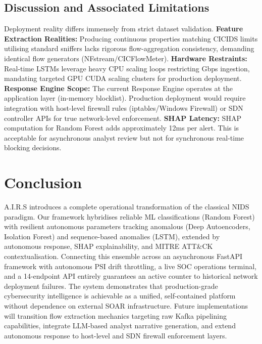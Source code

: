\documentclass[conference]{IEEEtran}
\begin{document}
\subsection{Discussion and Associated Limitations}
Deployment reality differs immensely from strict dataset validation.
\textbf{Feature Extraction Realities:} Producing continuous properties matching CICIDS limits utilising standard sniffers lacks rigorous flow-aggregation consistency, demanding identical flow generators (NFstream/CICFlowMeter).
\textbf{Hardware Restraints:} Real-time LSTMs leverage heavy CPU scaling loops restricting Gbps ingestion, mandating targeted GPU CUDA scaling clusters for production deployment.
\textbf{Response Engine Scope:} The current Response Engine operates at the application layer (in-memory blocklist). Production deployment would require integration with host-level firewall rules (iptables/Windows Firewall) or SDN controller APIs for true network-level enforcement.
\textbf{SHAP Latency:} SHAP computation for Random Forest adds approximately 12ms per alert. This is acceptable for asynchronous analyst review but not for synchronous real-time blocking decisions.

\section{Conclusion}
A.I.R.S introduces a complete operational transformation of the classical NIDS paradigm. Our framework hybridises reliable ML classifications (Random Forest) with resilient autonomous parameters tracking anomalous (Deep Autoencoders, Isolation Forest) and sequence-based anomalies (LSTM), extended by autonomous response, SHAP explainability, and MITRE ATT\&CK contextualisation. Connecting this ensemble across an asynchronous FastAPI framework with autonomous PSI drift throttling, a live SOC operations terminal, and a 14-endpoint API entirely guarantees an active counter to historical network deployment failures. The system demonstrates that production-grade cybersecurity intelligence is achievable as a unified, self-contained platform without dependence on external SOAR infrastructure. Future implementations will transition flow extraction mechanics targeting raw Kafka pipelining capabilities, integrate LLM-based analyst narrative generation, and extend autonomous response to host-level and SDN firewall enforcement layers.
\end{document}
